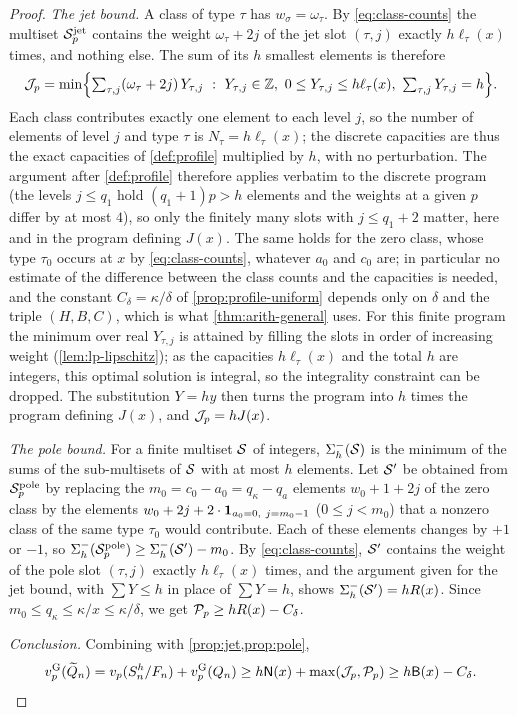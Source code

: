 \begin{proof}
\emph{The jet bound.} A class of type $\tau$ has $w_\sigma=\omega_\tau$. By \eqref{eq:class-counts} the multiset $\mathcal{S}^{\mathrm{jet}}_p$ contains the weight $\omega_\tau+2j$ of the jet slot $(\tau,j)$ exactly $h\ell_\tau(x)$ times, and nothing else. The sum of its $h$ smallest elements is therefore
\[
\cJ_p=\min\Bigl\{\textstyle\sum_{\tau,j}(\omega_\tau+2j)\,Y_{\tau,j}\ :\ Y_{\tau,j}\in\Z,\ 0\le Y_{\tau,j}\le h\ell_\tau(x),\ \sum_{\tau,j}Y_{\tau,j}=h\Bigr\}.
\]
Each class contributes exactly one element to each level $j$, so the number of elements of level $j$ and type $\tau$ is $N_\tau=h\ell_\tau(x)$; the discrete capacities are thus the exact capacities of \cref{def:profile} multiplied by $h$, with no perturbation. The argument after \cref{def:profile} therefore applies verbatim to the discrete program (the levels $j\le q_1$ hold $(q_1+1)p>h$ elements and the weights at a given $p$ differ by at most $4$), so only the finitely many slots with $j\le q_1+2$ matter, here and in the program defining $J(x)$. The same holds for the zero class, whose type $\tau_0$ occurs at $x$ by \eqref{eq:class-counts}, whatever $a_0$ and $c_0$ are; in particular no estimate of the difference between the class counts and the capacities is needed, and the constant $C_\delta=\kappa/\delta$ of \cref{prop:profile-uniform} depends only on $\delta$ and the triple $(H,B,C)$, which is what \cref{thm:arith-general} uses. For this finite program the minimum over real $Y_{\tau,j}$ is attained by filling the slots in order of increasing weight (\cref{lem:lp-lipschitz}); as the capacities $h\ell_\tau(x)$ and the total $h$ are integers, this optimal solution is integral, so the integrality constraint can be dropped. The substitution $Y=hy$ then turns the program into $h$ times the program defining $J(x)$, and $\mathcal{J}_p=hJ(x)$.

\emph{The pole bound.} For a finite multiset $\mathcal{S}$ of integers, $\Sigma^-_h(\mathcal{S})$ is the minimum of the sums of the sub-multisets of $\mathcal{S}$ with at most $h$ elements. Let $\mathcal{S}'$ be obtained from $\mathcal{S}^{\mathrm{pole}}_p$ by replacing the $m_0=c_0-a_0=q_\kappa-q_a$ elements $w_0+1+2j$ of the zero class by the elements $w_0+2j+2\cdot\mathbf{1}_{a_0=0,\ j=m_0-1}$ ($0\le j<m_0$) that a nonzero class of the same type $\tau_0$ would contribute. Each of these elements changes by $+1$ or $-1$, so $\Sigma^-_h(\mathcal{S}^{\mathrm{pole}}_p)\ge\Sigma^-_h(\mathcal{S}')-m_0$. By \eqref{eq:class-counts}, $\mathcal{S}'$ contains the weight of the pole slot $(\tau,j)$ exactly $h\ell_\tau(x)$ times, and the argument given for the jet bound, with $\sum Y\le h$ in place of $\sum Y=h$, shows $\Sigma^-_h(\mathcal{S}')=hR(x)$. Since $m_0\le q_\kappa\le\kappa/x\le\kappa/\delta$, we get $\mathcal{P}_p\ge hR(x)-C_\delta$.

\emph{Conclusion.} Combining with \cref{prop:jet,prop:pole},
\[
v^{\mathrm{G}}_{p}(\widetilde{Q}_n)=v_p(S_n^h/F_n)+v^{\mathrm{G}}_{p}(Q_n)\ge h\mathsf N(x)+\max(\mathcal{J}_p,\mathcal{P}_p)\ge h\mathsf B(x)-C_\delta. \qedhere
\]
\end{proof}

